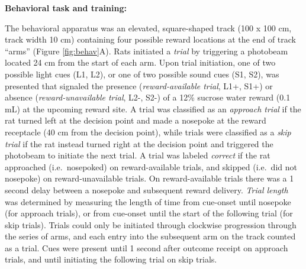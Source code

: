 \documentclass[11pt]{article}
\begin{document}
{\bf Behavioral task and training:}

The behavioral apparatus was an elevated, square-shaped track (100 x
100 cm, track width 10 cm) containing four possible reward locations
at the end of track ``arms'' (Figure \ref{fig:behav}A). Rats initiated a
{\it trial} by triggering a photobeam located 24 cm from the start of
each arm. Upon trial initiation, one of two possible light cues (L1,
L2), or one of two possible sound cues (S1, S2), was presented that
signaled the presence ({\it reward-available trial}, L1+, S1+) or
absence ({\it reward-unavailable trial}, L2-, S2-) of a 12\% sucrose
water reward (0.1 mL) at the upcoming reward site. A trial was
classified as an {\it approach trial} if the rat turned left at the
decision point and made a nosepoke at the reward receptacle (40 cm
from the decision point), while trials were classified as a {\it skip
trial} if the rat instead turned right at the decision point and
triggered the photobeam to initiate the next trial. A trial was labeled
{\it correct} if the rat approached (i.e.\ nosepoked) on
reward-available trials, and skipped (i.e.\ did not nosepoke) on
reward-unavailable trials. On reward-available trials there was a 1
second delay between a nosepoke and subsequent reward delivery. {\it
Trial length} was determined by measuring the length of time from
cue-onset until nosepoke (for approach trials), or from cue-onset
until the start of the following trial (for skip trials). Trials could
only be initiated through clockwise progression through the series of
arms, and each entry into the subsequent arm on the track counted as a
trial. Cues were present until 1  second after outcome receipt on approach trials, and until initiating the following trial on skip trials.
\end{document}
